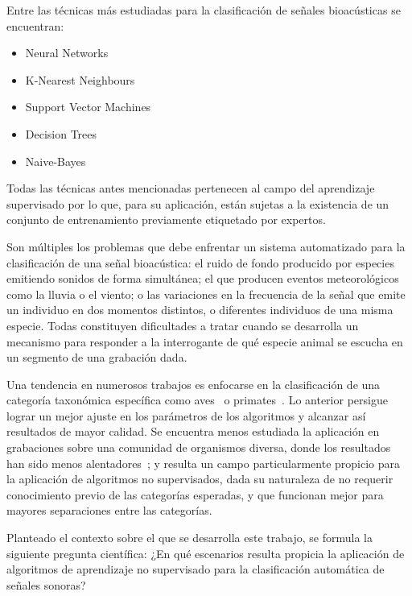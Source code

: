 Entre las técnicas más estudiadas para la clasificación de señales bioacústicas se encuentran:
\begin{itemize}
    \item Neural Networks~\cite{Deecke05,Gerhard03}
    \item K-Nearest Neighbours~\cite{Dunkel06}
    \item Support Vector Machines~\cite{Ilyas14}
    \item Decision Trees~\cite{Lasseck14}
    \item Naive-Bayes~\cite{Dunkel06}
\end{itemize}

Todas las técnicas antes mencionadas pertenecen al campo del aprendizaje supervisado por lo que, para su aplicación, están sujetas a la existencia de un conjunto de entrenamiento previamente etiquetado por expertos.

Son múltiples los problemas que debe enfrentar un sistema automatizado para la clasificación de una señal bioacústica: el ruido de fondo producido por especies emitiendo sonidos de forma simultánea;
el que producen eventos meteorológicos como la lluvia o el viento;
o las variaciones en la frecuencia de la señal que emite un individuo en dos momentos distintos, o diferentes individuos de una misma especie.
Todas constituyen dificultades a tratar cuando se desarrolla un mecanismo para responder a la interrogante de qué especie animal se escucha en un segmento de una grabación dada.

Una tendencia en numerosos trabajos es enfocarse en la clasificación de una categoría taxonómica específica como aves~\cite{Oliveira15,Lasseck14,Stowell14} o primates~\cite{Heinicke15}.
Lo anterior persigue lograr un mejor ajuste en los parámetros de los algoritmos y alcanzar así resultados de mayor calidad.
Se encuentra menos estudiada la aplicación en grabaciones sobre una comunidad de organismos diversa, donde los resultados han sido menos alentadores~\cite{Ilyas14}; y resulta un campo particularmente propicio para la aplicación de algoritmos no supervisados, dada su naturaleza de no requerir conocimiento previo de las categorías esperadas, y que funcionan mejor para mayores separaciones entre las categorías.

Planteado el contexto sobre el que se desarrolla este trabajo, se formula la siguiente pregunta científica: ¿En qué escenarios resulta propicia la aplicación de algoritmos de aprendizaje no supervisado para la clasificación automática de señales sonoras?

